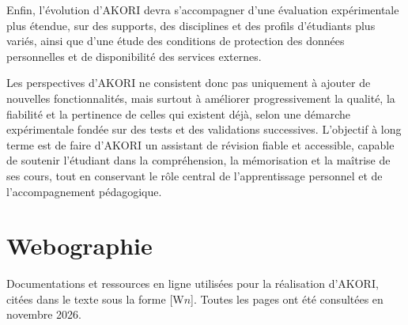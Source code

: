 \documentclass[12pt,a4paper,oneside]{report}
\begin{document}
Enfin, l'évolution d'AKORI devra s'accompagner d'une évaluation expérimentale plus étendue, sur des supports, des disciplines et des profils d'étudiants plus variés, ainsi que d'une étude des conditions de protection des données personnelles et de disponibilité des services externes.

Les perspectives d'AKORI ne consistent donc pas uniquement à ajouter de nouvelles fonctionnalités, mais surtout à améliorer progressivement la qualité, la fiabilité et la pertinence de celles qui existent déjà, selon une démarche expérimentale fondée sur des tests et des validations successives. L'objectif à long terme est de faire d'AKORI un assistant de révision fiable et accessible, capable de soutenir l'étudiant dans la compréhension, la mémorisation et la maîtrise de ses cours, tout en conservant le rôle central de l'apprentissage personnel et de l'accompagnement pédagogique.

\clearpage
{}



\chapter*{Webographie}

Documentations et ressources en ligne utilisées pour la réalisation d'AKORI, citées dans le texte sous la forme [W$n$]. Toutes les pages ont été consultées en novembre 2026.
\end{document}
